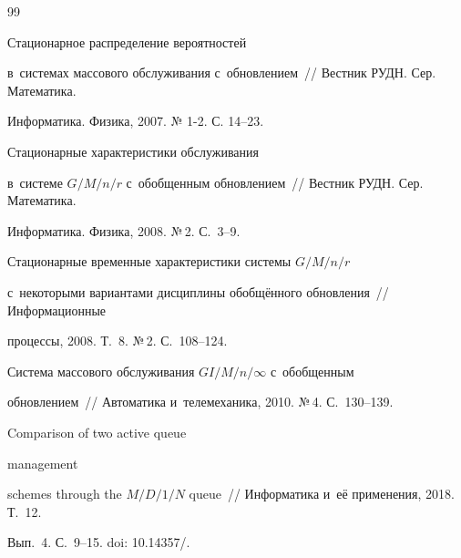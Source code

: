 {\small\frenchspacing

{%


\begin{thebibliography}{99}




 Стационарное распределение вероятностей 

в~сис\-те\-мах массового обслуживания с~обновлением~/\!\!/ Вестник РУДН. Сер. Математика. 

Информатика. Физика, 2007. № 1-2. С. 14--23.




 Стационарные характеристики обслуживания

в~системе $G/M/n/r$ с~обобщенным обновлением~/\!\!/ Вестник РУДН. Сер. Математика. 

Информатика. Физика, 2008. №\,2. С.~3--9.










 Стационарные временные характеристики системы $G/M/n/r$ 

с~некоторыми вариантами дисциплины обобщённого обновления~/\!\!/ Информационные 

процессы, 2008. Т.~8. №\,2. С.~108--124.




 Система массового обслуживания $GI/M/n/\infty$ с~обобщенным

об\-нов\-ле\-ни\-ем~/\!\!/ Автоматика и~телемеханика, 2010. №\,4. С.~130--139.




 Comparison of two active queue 

management

schemes through the $M/D/1/N$ queue~/\!\!/ Информатика и~её применения, 2018. Т.~12. 

Вып.~4. С.~9--15. doi: 10.14357\!/.





\end{thebibliography}}}
